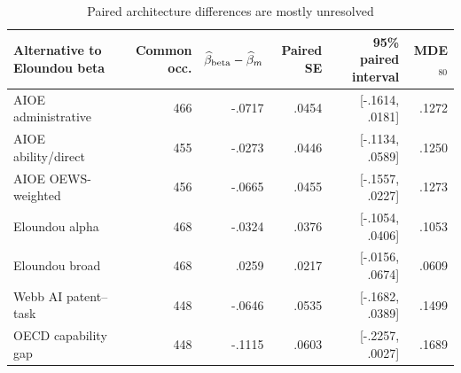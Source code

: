 \begin{table}[!htbp]
\centering
\caption{Paired architecture differences are mostly unresolved}\label{tab:stock}
\begin{threeparttable}
\scriptsize
\setlength{\tabcolsep}{3.2pt}
\begin{tabularx}{\textwidth}{@{}Yrrrrr@{}}
\toprule
Alternative to Eloundou beta & Common occ. & $\widehat\beta_{\rm beta}-\widehat\beta_{m}$ & Paired SE & 95\% paired interval & MDE$_{80}$ \\
\midrule
AIOE administrative & 466 & -.0717 & .0454 & [-.1614, .0181] & .1272 \\
AIOE ability/direct & 455 & -.0273 & .0446 & [-.1134, .0589] & .1250 \\
AIOE OEWS-weighted & 456 & -.0665 & .0455 & [-.1557, .0227] & .1273 \\
Eloundou alpha & 468 & -.0324 & .0376 & [-.1054, .0406] & .1053 \\
Eloundou broad & 468 & .0259 & .0217 & [-.0156, .0674] & .0609 \\
Webb AI patent--task & 448 & -.0646 & .0535 & [-.1682, .0389] & .1499 \\
OECD capability gap & 448 & -.1115 & .0603 & [-.2257, .0027] & .1689 \\
\bottomrule
\end{tabularx}
\end{threeparttable}
\end{table}
